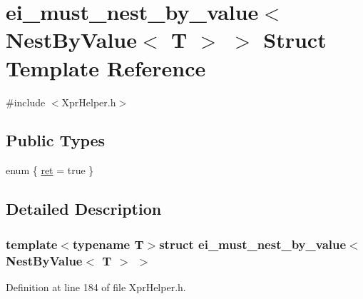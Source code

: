 \hypertarget{structei__must__nest__by__value_3_01_nest_by_value_3_01_t_01_4_01_4}{\section{ei\-\_\-must\-\_\-nest\-\_\-by\-\_\-value$<$ Nest\-By\-Value$<$ T $>$ $>$ Struct Template Reference}
\label{structei__must__nest__by__value_3_01_nest_by_value_3_01_t_01_4_01_4}
}


{\ttfamily \#include $<$Xpr\-Helper.\-h$>$}

\subsection*{Public Types}
\begin{DoxyCompactItemize}
\item 
enum \{ \hyperlink{structei__must__nest__by__value_3_01_nest_by_value_3_01_t_01_4_01_4_ad37cdcb9e26468fe206c79680bbd2d29ac0024792ad760db961cded5629272fec}{ret} = true
 \}
\end{DoxyCompactItemize}


\subsection{Detailed Description}
\subsubsection*{template$<$typename T$>$struct ei\-\_\-must\-\_\-nest\-\_\-by\-\_\-value$<$ Nest\-By\-Value$<$ T $>$ $>$}



Definition at line 184 of file Xpr\-Helper.\-h.




